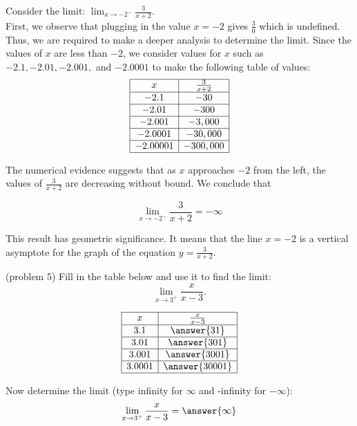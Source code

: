 \documentclass[handout]{ximera}
\begin{document}
\begin{example}[example 5]
Consider the limit: $\displaystyle \lim_{x \to -2^-} \frac{3}{x+2}.$\\
First, we observe that plugging in the value $x=-2$ gives $\frac{3}{0}$ which is undefined. 
Thus, we are required to make a deeper analysis to determine the limit.
Since the values of $x$ are less than $-2$, we consider values for $x$ such as 
$-2.1, -2.01, -2.001,$ and $-2.0001$ to make the following table of values:\\

\[
\begin{array}{ |c | c|}
	\hline
  x & \frac{3}{x+2}\\
  \hline
  -2.1 & -30 \\
  \hline
  -2.01 & -300 \\
  \hline
  -2.001 & -3,000 \\
  \hline
  -2.0001 & -30,000 \\
  \hline
  -2.00001 & -300,000 \\
  \hline
\end{array}
\] 

The numerical evidence suggests that as $x$ approaches $-2$ from the left, 
the values of $\frac{3}{x+2}$ are decreasing without bound. We conclude that 

\[\lim_{x \to -2^-} \frac{3}{x+2} =  -\infty \]

This result has geometric significance.
It means that the line $x=-2$ is a vertical asymptote for the graph of the equation $y = \frac{3}{x+2}.$
\end{example}



\begin{problem}(problem 5)
Fill in the table below and use it to find the limit:
\[\lim_{x \to 3^+} \frac{x}{x-3}.\]

\[
\begin{array}{ |c | c|}
	\hline
  x & \frac{x}{x-3}\\
  \hline
  3.1 & \answer{31}\\
  \hline
  3.01 & \answer{301} \\ 
  	\hline 
	3.001 & \answer{3001} \\
	\hline
	3.0001 & \answer{30001}\\
	\hline
\end{array}
\]

Now determine the limit (type infinity for $\infty$ and -infinity for $-\infty$):
\[
\lim_{x \to 3^+} \frac{x}{x-3} = \answer{\infty}
\]

\end{problem}
\end{document}

